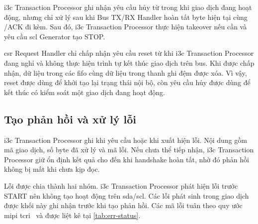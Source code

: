 \gls{i3c} Transaction Processor ghi nhận yêu cầu hủy từ \Host{} trong khi giao dịch đang hoạt động,
nhưng chỉ xử lý sau khi Bus TX/RX Handler hoàn tất byte hiện tại cùng \TBit{}/ACK đi
kèm. Sau đó, \gls{i3c} Transaction Processor thực hiện takeover nếu cần và yêu cầu \gls{scl} Generator tạo
STOP.

\gls{csr} Request Handler chỉ chấp nhận yêu cầu reset từ \Host{} khi \gls{i3c} Transaction Processor đang
nghỉ và không thực hiện trình tự kết thúc giao dịch trên bus. Khi được chấp nhận, dữ liệu trong
các \gls{fifo} cùng dữ liệu trong thanh ghi đệm được xóa. Vì vậy, reset được dùng
để khởi tạo lại trạng thái nội bộ, còn yêu cầu hủy được dùng để kết thúc có kiểm soát một giao
dịch đang hoạt động.

\subsection{Tạo phản hồi và xử lý lỗi}
\label{sec:arch-err}

\gls{i3c} Transaction Processor ghi \ResponseDescriptor{} khi \CommandDescriptor{} yêu cầu hoặc khi
xuất hiện lỗi. Nội dung gồm mã giao dịch, số byte đã xử lý và mã lỗi. Nếu \ResponseFifo{} chưa
thể tiếp nhận, \gls{i3c} Transaction Processor giữ ổn định kết quả cho đến khi handshake hoàn tất,
nhờ đó phản hồi không bị mất khi \Host{} chưa kịp đọc.

Lỗi được chia thành hai nhóm. \gls{i3c} Transaction Processor phát hiện lỗi \CommandDescriptor{} trước
START nên không tạo hoạt động trên \gls{sda}/\gls{scl}. Các lỗi phát sinh trong giao dịch được khối này ghi
nhận trước khi tạo phản hồi. Các mã lỗi tuân theo quy ước \gls{mipi} \gls{tcri}~\cite{mipi_i3c_tcri} và được
liệt kê tại \cref{tab:err-status}.

